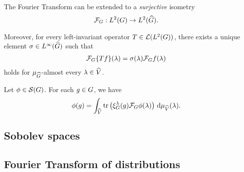 \begin{theorem}
    The Fourier Transform can be extended to a \emph{surjective} isometry
    \begin{align*}
        \mathcal{F}_{G} : {L^{2} (G)} \to {L^{2} ({\widehat{G}})}.
    \end{align*}

    Moreover, for every left-invariant operator $T \in {\mathcal{L} ({L^{2} (G)})}$,
    there exists a unique element $\sigma \in {L^{\infty} ({\widehat{G}})}$ such that
    \begin{align*}
        \mathcal{F}_{G}\{T f\}(\lambda) = \sigma(\lambda) \mathcal{F}_{G} f(\lambda)
    \end{align*}
    holds for $\mu_{{\widehat{G}}}$-almost every $\lambda \in {\widehat{V}}$.
\end{theorem}

\begin{proposition}
\label{proposition:inverse_Fourier_Transform}
    Let $\phi \in {\mathcal{S} (G)}$.
    For each $g \in G$,
    we have
    \begin{align*}
        \phi(g)
        = \int_{\widehat{V}}
        \operatorname{tr} \left( \xi^{\lambda}_G(g) \mathcal{F}_{G} \phi(\lambda) \right) \,\mathrm{d} \mu_{{\widehat{V}}}(\lambda).
    \end{align*}
\end{proposition}

\subsection{Sobolev spaces}

\subsection{Fourier Transform of distributions}
